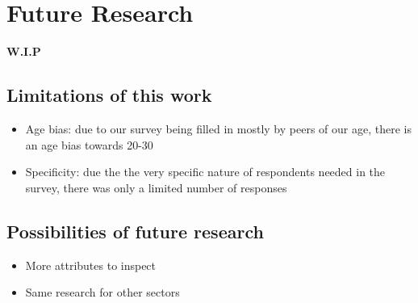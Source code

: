 \mainmatter
\pagestyle{headings}
\chapter{Future Research}
\label{ch:futureResearch}

\textbf{W.I.P}

\section{Limitations of this work}
\begin{itemize}
	\item Age bias: due to our survey being filled in mostly by peers of our age, there is an age bias towards 20-30
	\item Specificity: due the the very specific nature of respondents needed in the survey, there was only a limited number of responses
\end{itemize}

\section{Possibilities of future research}
\begin{itemize}
	\item More attributes to inspect
	\item Same research for other sectors
\end{itemize}
